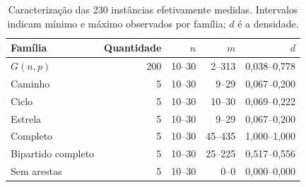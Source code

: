 \begin{table}[htbp]
\centering
\caption{Caracterização das 230 instâncias efetivamente medidas. Intervalos indicam mínimo e máximo observados por família; $d$ é a densidade.}
\label{tab:characterization}
\small
\begin{tabular}{lrrrr}
\toprule
Família & Quantidade & $n$ & $m$ & $d$ \\
\midrule
$G(n,p)$ & 200 & 10--30 & 2--313 & 0,038--0,778 \\
Caminho & 5 & 10--30 & 9--29 & 0,067--0,200 \\
Ciclo & 5 & 10--30 & 10--30 & 0,069--0,222 \\
Estrela & 5 & 10--30 & 9--29 & 0,067--0,200 \\
Completo & 5 & 10--30 & 45--435 & 1,000--1,000 \\
Bipartido completo & 5 & 10--30 & 25--225 & 0,517--0,556 \\
Sem arestas & 5 & 10--30 & 0--0 & 0,000--0,000 \\
\bottomrule
\end{tabular}
\end{table}
